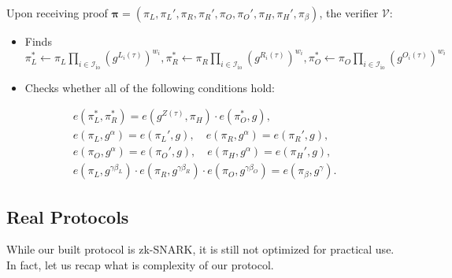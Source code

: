 \documentclass[../lecture-notes.tex]{subfiles}
\begin{document}
\begin{tcolorbox}
    \newpage

    Upon receiving proof $\boldsymbol{\pi} = (\pi_L,\pi_L',\pi_R,\pi_R',\pi_O,\pi_O',\pi_H,\pi_H',\pi_{\beta})$, the verifier $\mathcal{V}$:
    \begin{itemize}[label=]
        \item Finds $\pi_L^* \gets \pi_L\prod_{i \in \mathcal{I}_{\text{io}}} (g^{L_i(\tau)})^{w_i},\pi_R^* \gets \pi_R\prod_{i \in \mathcal{I}_{\text{io}}} (g^{R_i(\tau)})^{w_i},\pi_O^* \gets \pi_O\prod_{i \in \mathcal{I}_{\text{io}}} (g^{O_i(\tau)})^{w_i}$
        \item Checks whether all of the following conditions hold:
    \end{itemize}
    \begin{align*}
        e(\pi_L^*, \pi_R^*) = e(g^{Z(\tau)}, \pi_H) \cdot e(\pi_O^*, g), \\
        e(\pi_L, g^{\alpha}) = e(\pi_L', g), \quad e(\pi_R, g^{\alpha}) = e(\pi_R', g), \\
        e(\pi_O, g^{\alpha}) = e(\pi_O', g), \quad e(\pi_H, g^{\alpha}) = e(\pi_H', g), \\
        e(\pi_L, g^{\gamma\beta_L}) \cdot e(\pi_R, g^{\gamma\beta_R}) \cdot e(\pi_O, g^{\gamma\beta_O}) = e(\pi_{\beta}, g^{\gamma}).
    \end{align*}
\end{tcolorbox}

\subsection{Real Protocols}

While our built protocol is zk-SNARK, it is still not optimized for practical use. In fact, let us recap what is complexity of our protocol.
\end{document}
